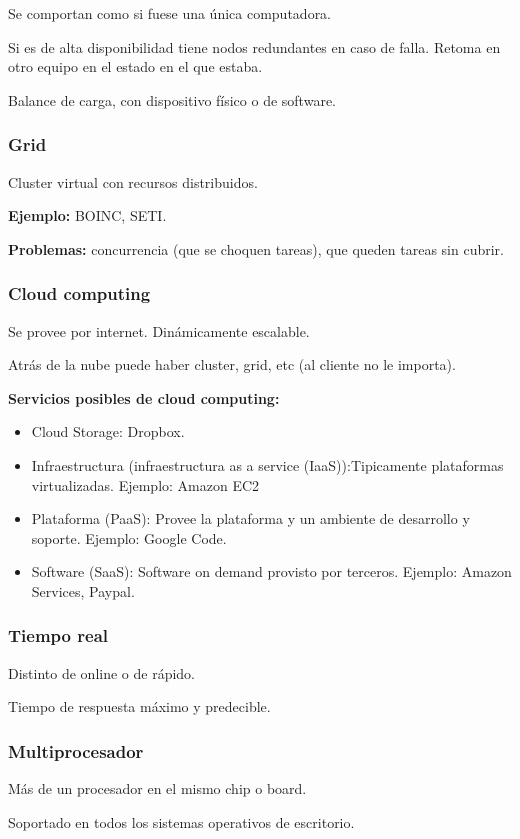\documentclass[a4paper, twoside]{article}
\begin{document}
Se comportan como si fuese una única computadora.

Si es de alta disponibilidad tiene nodos redundantes en caso de falla. Retoma en otro equipo en el estado en el que estaba. 

Balance de carga, con dispositivo físico o de software.

\subsubsection{Grid}
Cluster virtual con recursos distribuidos.

\textbf{Ejemplo:} BOINC, SETI.

\textbf{Problemas:} concurrencia (que se choquen tareas), que queden tareas sin cubrir.

\subsubsection{Cloud computing}
Se provee por internet. Dinámicamente escalable.

Atrás de la nube puede haber cluster, grid, etc (al cliente no le importa).

\textbf{Servicios posibles de cloud computing:}
\begin{itemize}
	\item Cloud Storage: Dropbox.
	\item Infraestructura (infraestructura as a service (IaaS)):Tipicamente plataformas virtualizadas. Ejemplo: Amazon EC2
	\item Plataforma (PaaS): Provee la plataforma y un ambiente de desarrollo y soporte. Ejemplo: Google Code.
	\item Software (SaaS): Software on demand provisto por terceros. Ejemplo: Amazon Services, Paypal. 
\end{itemize}

\subsubsection{Tiempo real}
Distinto de online o de rápido.

Tiempo de respuesta máximo y predecible.

\subsubsection{Multiprocesador}
Más de un procesador en el mismo chip o board.

Soportado en todos los sistemas operativos de escritorio.
\end{document}
